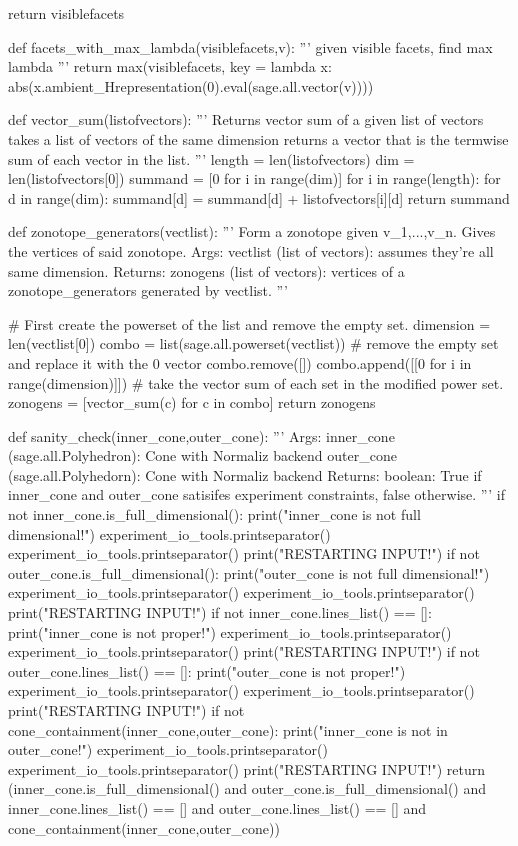 \documentclass{TC}
\begin{document}
\begin{SAGE}
		return visiblefacets



def facets_with_max_lambda(visiblefacets,v):
	''' given visible facets, find max lambda '''
	return max(visiblefacets, key = lambda x: abs(x.ambient_Hrepresentation(0).eval(sage.all.vector(v))))


def vector_sum(listofvectors):
	''' Returns vector sum of a given list of vectors  takes a list of vectors of the same dimension
	returns a vector that is the termwise sum of each vector in the list.
	'''
	length = len(listofvectors)
	dim = len(listofvectors[0])
	summand = [0 for i in range(dim)]
	for i in range(length):
		for d in range(dim):
			summand[d] = summand[d] + listofvectors[i][d]
	return summand


def zonotope_generators(vectlist):
	'''  Form a zonotope given v_1,...,v_n. Gives the vertices of said zonotope.
	Args:
		vectlist (list of vectors): assumes they're all same dimension.
	Returns:
		zonogens (list of vectors): vertices of a zonotope_generators generated
			by vectlist.
	'''

	# First create the powerset of the list	and remove the empty set.
	dimension = len(vectlist[0])
	combo = list(sage.all.powerset(vectlist))
	# remove the empty set and replace it with the 0 vector
	combo.remove([])
	combo.append([[0 for i in range(dimension)]])
	# take the vector sum of each set in the modified power set.
	zonogens = [vector_sum(c) for c in combo]
	return zonogens


def sanity_check(inner_cone,outer_cone):
	'''
	Args: 
		inner_cone (sage.all.Polyhedron): Cone with Normaliz backend
		outer_cone (sage.all.Polyhedorn): Cone with Normaliz backend
	Returns:
		boolean: True if inner_cone and outer_cone satisifes experiment constraints, false otherwise.
	'''
    if not inner_cone.is_full_dimensional():
        print("inner_cone is not full dimensional!")
        experiment_io_tools.printseparator()
        experiment_io_tools.printseparator()
        print("RESTARTING INPUT!")
    if not outer_cone.is_full_dimensional():
        print("outer_cone is not full dimensional!")
        experiment_io_tools.printseparator()
        experiment_io_tools.printseparator()
        print("RESTARTING INPUT!")
    if not inner_cone.lines_list() == []:
        print("inner_cone is not proper!")
        experiment_io_tools.printseparator()
        experiment_io_tools.printseparator()
        print("RESTARTING INPUT!")
    if not outer_cone.lines_list() == []:
        print("outer_cone is not proper!")
        experiment_io_tools.printseparator()
        experiment_io_tools.printseparator()        
        print("RESTARTING INPUT!")
    if not cone_containment(inner_cone,outer_cone):
        print("inner_cone is not in outer_cone!")
        experiment_io_tools.printseparator()
        experiment_io_tools.printseparator()
        print("RESTARTING INPUT!")
    return (inner_cone.is_full_dimensional() and outer_cone.is_full_dimensional() and inner_cone.lines_list() == [] and outer_cone.lines_list() == [] and cone_containment(inner_cone,outer_cone))
\end{SAGE}
\end{document}
